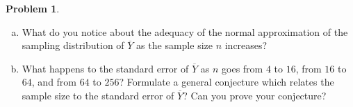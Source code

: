 \documentclass[10pt]{article}
\theoremstyle{definition}
\newtheorem{problem}[theorem]{Problem}
\begin{document}
\begin{problem}
\begin{enumerate}[(a)]
    Do this for $n=4,16,32$ and $64$.
    
    To be extra spicy, you can overlay the normal curve approximation given by
    the central limit theorem by running the following code after you plot your
    histogram:

    \texttt{curve(dnorm(x, mean=3, sd=sqrt(6/n)), add=TRUE)}
    
    \item What do you notice about the adequacy of the normal approximation of
    the sampling distribution of $\overline{Y}$ as the sample size $n$
    increases?
    \item \label{item:1} What happens to the standard error of $\overline{Y}$ as $n$ goes
    from $4$ to $16$, from $16$ to $64$, and from $64$ to $256$? Formulate a general
    conjecture which relates the sample size to the standard error of
    $\overline{Y}$?  Can you prove your conjecture?
  \end{enumerate}
\end{problem}

\end{document}
